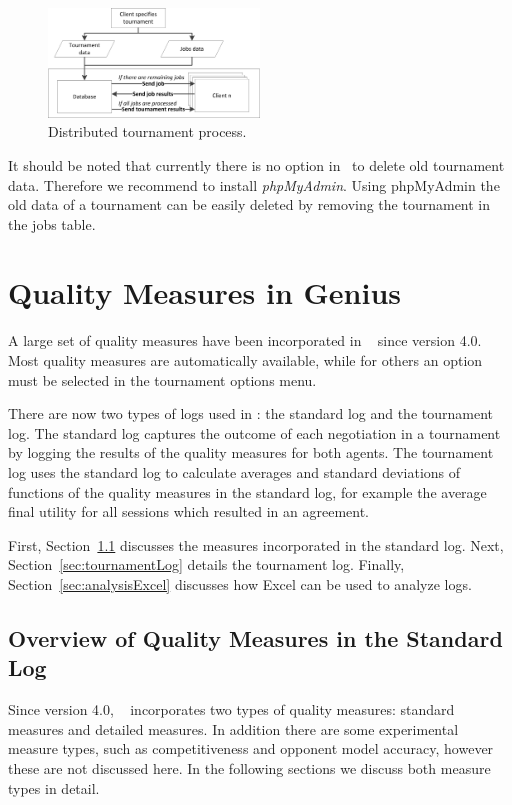 \documentclass[]{article}
\begin{document}
\begin{figure}[htb]
	\centering
	\includegraphics[width=0.50\textwidth]{media/DistributedGenius.png}
\caption{Distributed tournament process.}\label{fig:dtournament}
\end{figure}

It should be noted that currently there is no option in \Genius~to delete old tournament data. Therefore we recommend to install \textit{phpMyAdmin}. Using phpMyAdmin the old data of a tournament can be easily deleted by removing the tournament in the jobs table.

\section{Quality Measures in Genius}\label{sec:qm}
A large set of quality measures have been incorporated in \Genius~ since version 4.0. Most quality measures are automatically available, while for others an option must be selected in the tournament options menu.

There are now two types of logs used in \Genius: the standard log and the tournament log. The standard log captures the outcome of each negotiation in a tournament by logging the results of the quality measures for both agents. The tournament log uses the standard log to calculate averages and standard deviations of functions of the quality measures in the standard log, for example the average final utility for all sessions which resulted in an agreement.

First, Section~\ref{sec:standardLog} discusses the measures incorporated in the standard log. Next, Section~\ref{sec:tournamentLog} details the tournament log. Finally, Section~\ref{sec:analysisExcel} discusses how Excel can be used to analyze logs.

\subsection{Overview of Quality Measures in the Standard Log}\label{sec:standardLog}
Since version 4.0, \Genius~ incorporates two types of quality measures: standard measures and detailed measures. In addition there are some experimental measure types, such as competitiveness and opponent model accuracy, however these are not discussed here. In the following sections we discuss both measure types in detail.
\end{document}
